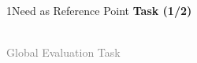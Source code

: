 \documentclass[xcolor=table,9pt,aspectratio=169]{beamer}
\begin{document}
\begin{frame}{\vspace*{10mm}1\hspace*{1em}Need as Reference Point}
\textbf{Task (1/2)}\\
\medskip
\begin{center}
   \\
   \textcolor{gray}{Global Evaluation Task}
\end{center}
\end{frame}
\end{document}
